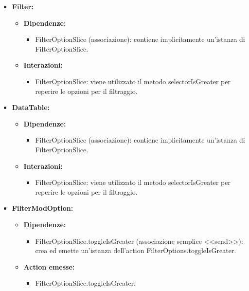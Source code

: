 \begin{itemize}
    \item \textbf{Filter:}
          \begin{itemize}
              \item \textbf{Dipendenze:}
                    \begin{itemize}
                        \item FilterOptionSlice (associazione): contiene implicitamente un'istanza di
                              FilterOptionSlice.
                    \end{itemize}
              \item \textbf{Interazioni:}
                    \begin{itemize}
                        \item FilterOptionSlice: viene utilizzato il metodo selectorIsGreater per reperire le
                              opzioni per il filtraggio.
                    \end{itemize}
          \end{itemize}

    \item \textbf{DataTable:}
          \begin{itemize}
              \item \textbf{Dipendenze:}
                    \begin{itemize}
                        \item FilterOptionSlice (associazione): contiene implicitamente un'istanza di
                              FilterOptionSlice.
                    \end{itemize}
              \item \textbf{Interazioni:}
                    \begin{itemize}
                        \item FilterOptionSlice: viene utilizzato il metodo selectorIsGreater per reperire le
                              opzioni per il filtraggio.
                    \end{itemize}
          \end{itemize}

    \item \textbf{FilterModOption:}
          \begin{itemize}
              \item \textbf{Dipendenze:}
                    \begin{itemize}
                        \item FilterOptionSlice.toggleIsGreater (associazione semplice <<send>>): crea ed
                              emette un'istanza dell'action FilterOptions.toggleIsGreater.
                    \end{itemize}
              \item \textbf{Action emesse:}
                    \begin{itemize}
                        \item FilterOptionSlice.toggleIsGreater.
                    \end{itemize}
          \end{itemize}
\end{itemize}

